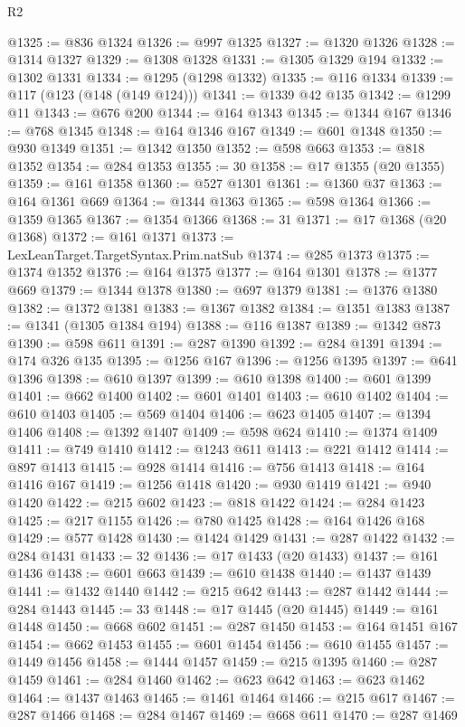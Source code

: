 \begin{lexlean}{R2}
\begin{coremodule}
@1325 := @836 @1324
@1326 := @997 @1325
@1327 := @1320 @1326
@1328 := @1314 @1327
@1329 := @1308 @1328
@1331 := @1305 @1329 @194
@1332 := @1302 @1331
@1334 := @1295 (@1298 @1332)
@1335 := @116 @1334
@1339 := @117 (@123 (@148 (@149 @124)))
@1341 := @1339 @42 @135
@1342 := @1299 @11
@1343 := @676 @200
@1344 := @164 @1343
@1345 := @1344 @167
@1346 := @768 @1345
@1348 := @164 @1346 @167
@1349 := @601 @1348
@1350 := @930 @1349
@1351 := @1342 @1350
@1352 := @598 @663
@1353 := @818 @1352
@1354 := @284 @1353
@1355 := 30
@1358 := @17 @1355 (@20 @1355)
@1359 := @161 @1358
@1360 := @527 @1301
@1361 := @1360 @37
@1363 := @164 @1361 @669
@1364 := @1344 @1363
@1365 := @598 @1364
@1366 := @1359 @1365
@1367 := @1354 @1366
@1368 := 31
@1371 := @17 @1368 (@20 @1368)
@1372 := @161 @1371
@1373 := LexLeanTarget.TargetSyntax.Prim.natSub
@1374 := @285 @1373
@1375 := @1374 @1352
@1376 := @164 @1375
@1377 := @164 @1301
@1378 := @1377 @669
@1379 := @1344 @1378
@1380 := @697 @1379
@1381 := @1376 @1380
@1382 := @1372 @1381
@1383 := @1367 @1382
@1384 := @1351 @1383
@1387 := @1341 (@1305 @1384 @194)
@1388 := @116 @1387
@1389 := @1342 @873
@1390 := @598 @611
@1391 := @287 @1390
@1392 := @284 @1391
@1394 := @174 @326 @135
@1395 := @1256 @167
@1396 := @1256 @1395
@1397 := @641 @1396
@1398 := @610 @1397
@1399 := @610 @1398
@1400 := @601 @1399
@1401 := @662 @1400
@1402 := @601 @1401
@1403 := @610 @1402
@1404 := @610 @1403
@1405 := @569 @1404
@1406 := @623 @1405
@1407 := @1394 @1406
@1408 := @1392 @1407
@1409 := @598 @624
@1410 := @1374 @1409
@1411 := @749 @1410
@1412 := @1243 @611
@1413 := @221 @1412
@1414 := @897 @1413
@1415 := @928 @1414
@1416 := @756 @1413
@1418 := @164 @1416 @167
@1419 := @1256 @1418
@1420 := @930 @1419
@1421 := @940 @1420
@1422 := @215 @602
@1423 := @818 @1422
@1424 := @284 @1423
@1425 := @217 @1155
@1426 := @780 @1425
@1428 := @164 @1426 @168
@1429 := @577 @1428
@1430 := @1424 @1429
@1431 := @287 @1422
@1432 := @284 @1431
@1433 := 32
@1436 := @17 @1433 (@20 @1433)
@1437 := @161 @1436
@1438 := @601 @663
@1439 := @610 @1438
@1440 := @1437 @1439
@1441 := @1432 @1440
@1442 := @215 @642
@1443 := @287 @1442
@1444 := @284 @1443
@1445 := 33
@1448 := @17 @1445 (@20 @1445)
@1449 := @161 @1448
@1450 := @668 @602
@1451 := @287 @1450
@1453 := @164 @1451 @167
@1454 := @662 @1453
@1455 := @601 @1454
@1456 := @610 @1455
@1457 := @1449 @1456
@1458 := @1444 @1457
@1459 := @215 @1395
@1460 := @287 @1459
@1461 := @284 @1460
@1462 := @623 @642
@1463 := @623 @1462
@1464 := @1437 @1463
@1465 := @1461 @1464
@1466 := @215 @617
@1467 := @287 @1466
@1468 := @284 @1467
@1469 := @668 @611
@1470 := @287 @1469

\end{coremodule}
\end{lexlean}

